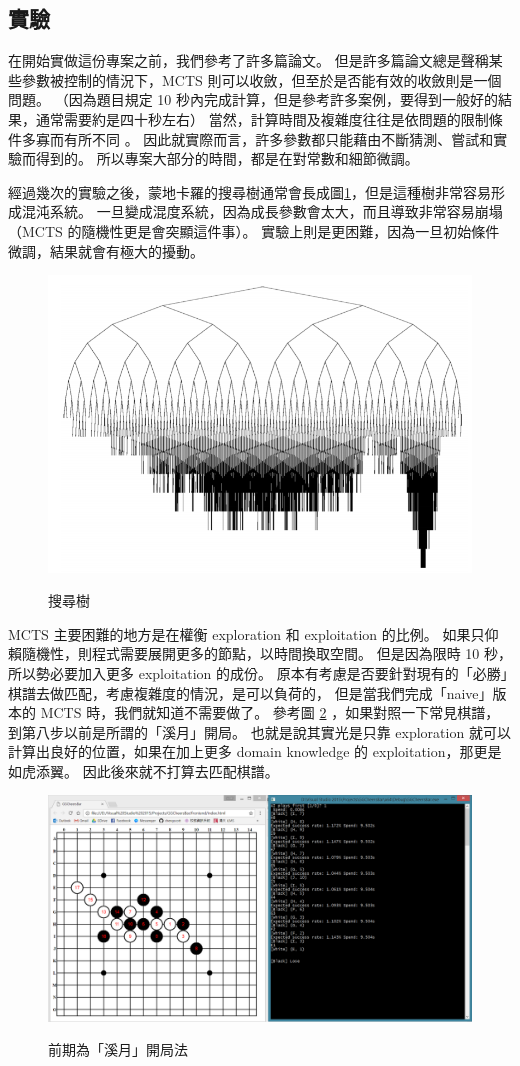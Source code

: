\documentclass[12pt]{article}
\begin{document}
\begin{CJK}{UTF8}{bsmi}
\section{實驗}
在開始實做這份專案之前，我們參考了許多篇論文。
但是許多篇論文總是聲稱某些參數被控制的情況下，MCTS 則可以收斂，但至於是否能有效的收斂則是一個問題。
（因為題目規定 10 秒內完成計算，但是參考許多案例，要得到一般好的結果，通常需要約是四十秒左右）
當然，計算時間及複雜度往往是依問題的限制條件多寡而有所不同 \cite{SVMCTS}。
因此就實際而言，許多參數都只能藉由不斷猜測、嘗試和實驗而得到的。
所以專案大部分的時間，都是在對常數和細節微調。

經過幾次的實驗之後，蒙地卡羅的搜尋樹通常會長成圖\ref{search}，但是這種樹非常容易形成混沌系統\cite{CHAOS}。
一旦變成混度系統，因為成長參數會太大，而且導致非常容易崩塌（MCTS 的隨機性更是會突顯這件事）。
實驗上則是更困難，因為一旦初始條件微調，結果就會有極大的擾動。
\begin{figure}[h]
  \caption{搜尋樹}
  \centering
  \includegraphics[width=.5\textwidth]{search}
  \label{search}
\end{figure}


MCTS 主要困難的地方是在權衡 exploration 和 exploitation 的比例。
如果只仰賴隨機性，則程式需要展開更多的節點，以時間換取空間。
但是因為限時 10 秒，所以勢必要加入更多 exploitation 的成份。
原本有考慮是否要針對現有的「必勝」棋譜去做匹配，考慮複雜度的情況，是可以負荷的，
但是當我們完成「naive」版本的 MCTS 時，我們就知道不需要做了。
參考圖 \ref{intelligent} ，如果對照一下常見棋譜，到第八步以前是所謂的「溪月」開局\cite{Keigetsu}。
也就是說其實光是只靠 exploration 就可以計算出良好的位置，如果在加上更多 domain knowledge 的 exploitation，那更是如虎添翼。
因此後來就不打算去匹配棋譜。

\begin{figure}
  \caption{前期為「溪月」開局法}
  \centering
  \includegraphics[width=1\textwidth]{intelligent}
  \label{intelligent}
\end{figure}


\end{CJK}
\end{document}
